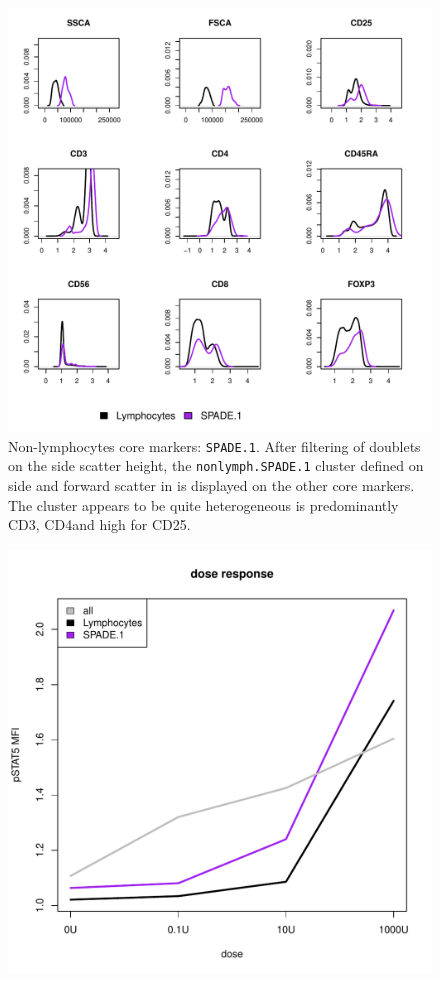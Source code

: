 \begin{figure}
  \centering
\begin{minipage}{.9\textwidth}
\includegraphics[width=\linewidth]{figures/spade-nonlymphocytes-clusters}
{ Non-lymphocytes core markers: \texttt{SPADE.1}.  }
{
    After filtering of doublets on the side scatter height, the \texttt{nonlymph.SPADE.1} cluster defined on side and forward scatter in  is displayed on the other core markers.
    The cluster appears to be quite heterogeneous is predominantly CD3\positive, CD4\positive and high for CD25.
} 
\end{minipage}
%
\begin{minipage}{.5\textwidth}
  \includegraphics[width=\linewidth]{figures/spade-nonlymphocytes-dose-response}

\end{minipage}
\end{figure}
